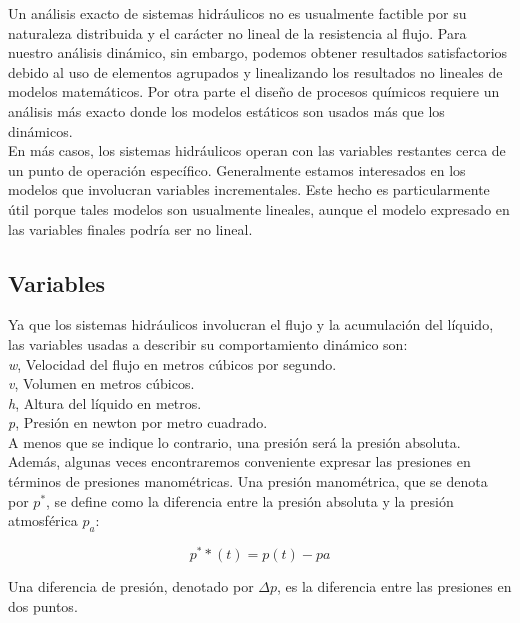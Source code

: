 \documentclass[a4paper,12pt,twoside]{proyectotanquesecci}
\begin{document}
Un análisis exacto de sistemas hidráulicos no es usualmente factible por su naturaleza distribuida y el carácter no lineal de la resistencia al flujo. Para nuestro análisis dinámico, sin embargo, podemos obtener resultados satisfactorios debido al uso de elementos agrupados y linealizando los resultados no lineales de modelos matemáticos. Por otra parte el diseño de procesos químicos requiere un análisis más exacto donde los modelos estáticos son usados más que los dinámicos.\\

En más casos, los sistemas hidráulicos operan con las variables restantes cerca de un punto de operación específico. Generalmente estamos interesados en los modelos que involucran variables incrementales. Este hecho es particularmente útil porque tales modelos son usualmente lineales, aunque el modelo expresado en las variables finales podría ser no lineal.\\

\subsection{Variables}

Ya que los sistemas hidráulicos involucran el flujo  y la acumulación del líquido, las variables usadas a describir su comportamiento dinámico son:\\

\textit{w}, Velocidad del flujo en metros cúbicos por segundo.\\ 

\textit{v}, Volumen en metros cúbicos.\\ 

\textit{h}, Altura del líquido en metros.\\ 

\textit{p}, Presión en newton por metro cuadrado.\\

A menos que se indique lo contrario, una presión será la presión absoluta. Además,  algunas veces encontraremos conveniente expresar las presiones en términos de presiones manométricas. Una presión manométrica, que se denota por $p^{*}$, se define como la diferencia entre la presión absoluta y la presión atmosférica ${p_{a}}$:

\begin{equation}
p^{*}*(t)=p(t)-pa
\label{Ecu 1}
\end{equation}

Una diferencia de presión, denotado por $\Delta p$, es la diferencia entre las presiones en dos puntos.
\end{document}
